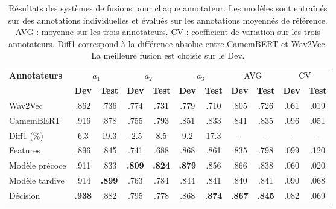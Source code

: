 \begin{table}[h]
    \centering
    \begin{tabular}{|l |cc| cc | cc | cc | cc|}\hline
     \textbf{Annotateurs} & \multicolumn{2}{c|}{$a_1$} & \multicolumn{2}{c|}{$a_2$}  &\multicolumn{2}{c|}{$a_3$} &\multicolumn{2}{c|}{AVG} & \multicolumn{2}{c|}{CV}\\
      & \textbf{Dev} &\textbf{Test} &\textbf{Dev}  &\textbf{Test} & \textbf{Dev} &\textbf{Test} & \textbf{Dev} &\textbf{Test}  & \textbf{Dev} &\textbf{Test}\\ \hline

     Wav2Vec    & .862 & .736 & .774 & .731 & .779 & .710 & .805 & .726 & .061 & .019\\
     CamemBERT  & .916 & .878 & .755 & .793 & .851 & .833 & .841 & .835 & .096 & .051\\
     Diff1 (\%)           & 6.3 & 19.3 & -2.5 & 8.5 & 9.2 & 17.3 & - & - & - & -\\
     \hline
     Features           & .896 & .845 & .741 & .688 & .868 & .861 & .835 & .798 & .099 & .120 \\
     \hline
     Modèle précoce     & .911 & .833 & \textbf{.809} & \textbf{.824} & \textbf{.879} & .856 & .866 & .838 & .060 & .020\\
     Modèle tardive      & .914 & \textbf{.899} & .763 & .784 & .844 & .841 & .840 & .841 & .090 & .068\\
     \hline
     Décision           & \textbf{.938} & .882 & .795 & .778 & .868 & \textbf{.874} & \textbf{.867} & \textbf{.845} & .082 & .069 \\
     \hline

    \end{tabular}
    \caption{Résultats des systèmes de fusions pour chaque annotateur. Les modèles sont entraînés sur des annotations individuelles et évalués sur les annotations moyennés de référence. AVG : moyenne sur les trois annotateurs. CV : coefficient de variation sur les trois annotateurs. Diff1 correspond à la différence absolue entre CamemBERT et Wav2Vec. La meilleure fusion est choisie sur le Dev.}
    \label{tab:moy_by_annotator}
\end{table}
